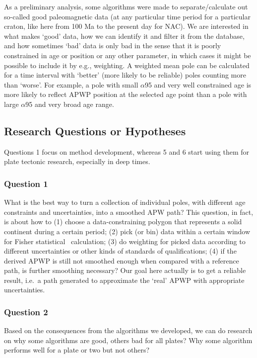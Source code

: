 As a preliminary analysis, some algorithms were made to separate/calculate out
so-called good paleomagnetic data (at any particular time period for a
particular craton, like here from 100 Ma to the present day for NAC). We are
interested in what makes `good' data, how we can identify it and filter it from
the database, and how sometimes `bad' data is only bad in the sense that it is
poorly constrained in age or position or any other parameter, in which cases it
might be possible to include it by e.g., weighting. A weighted mean pole can be
calculated for a time interval with `better' (more likely to be reliable) poles
counting more than `worse'. For example, a pole with small $\alpha$95 and very
well constrained age is more likely to reflect APWP position at the selected age
point than a pole with large $\alpha$95 and very broad age range.

\subsection{Research Questions or Hypotheses}

Questions 1 focus on method development, whereas 5 and 6 start
using them for plate tectonic research, especially in deep times.

\subsubsection{Question 1}

What is the best way to turn a collection of individual poles, with different
age constraints and uncertainties, into a smoothed APW path? This question, in
fact, is about how to (1) choose a data-constraining polygon that represents a
solid continent during a certain period; (2) pick (or bin) data within a certain
window for Fisher statistical~\citep{F53} calculation; (3) do weighting for
picked data according to different uncertainties or other kinds of standards of
qualifications; (4) if the derived APWP is still not smoothed enough when
compared with a reference path, is further smoothing necessary? Our goal here
actually is to get a reliable result, i.e.\ a path generated to approximate the
`real' APWP with appropriate uncertainties.

\subsubsection{Question 2}

Based on the consequences from the algorithms we developed, we can do research
on why some algorithms are good, others bad for all plates? Why some algorithm
performs well for a plate or two but not others?

